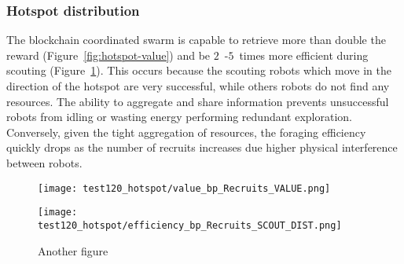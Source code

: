 \documentclass[runningheads]{llncs}
\begin{document}

\subsubsection{Hotspot distribution}

The blockchain coordinated swarm is capable to retrieve more than double the reward (Figure~\ref{fig:hotspot-value}) and be $2$~-$5$~times more efficient during scouting (Figure~\ref{fig:hotspot-eff-exp}). This occurs because the scouting robots which move in the direction of the hotspot are very successful, while others robots do not find any resources. The ability to aggregate and share information prevents unsuccessful robots from idling or wasting energy performing redundant exploration. Conversely, given the tight aggregation of resources, the foraging efficiency quickly drops as the number of recruits increases due higher physical interference between robots. %

\begin{figure}
\centering
\begin{minipage}{.495\textwidth}
  \centering
  \texttt{[image: test120\_hotspot/value\_bp\_Recruits\_VALUE.png]}
  \caption{}
  \label{fig:hotspot-value}
\end{minipage}
\begin{minipage}{.495\textwidth}
  \centering
  \texttt{[image: test120\_hotspot/efficiency\_bp\_Recruits\_SCOUT\_DIST.png]}
  \caption{Another figure}
  \label{fig:hotspot-eff-exp}
\end{minipage}
\end{figure}
\end{document}

